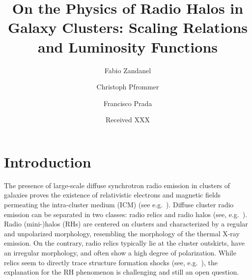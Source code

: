 \documentclass[traditabstract]{aa}
\begin{document}
\title{On the Physics of Radio Halos in Galaxy Clusters: Scaling Relations and Luminosity Functions}

\author{
 Fabio Zandanel \and
 Christoph Pfrommer \and
 Francisco Prada
}

\date{Received XXX}

\abstract{
}




\maketitle


\section{Introduction}
\label{sec:1}
The presence of large-scale diffuse synchrotron radio emission in clusters of
galaxies proves the existence of relativistic electrons and magnetic fields
permeating the intra-cluster medium (ICM) (see
e.g.~\citealp{2004NewAR..48.1137F}).
\begingroup
\let\thefootnote\relax{}
\endgroup
Diffuse cluster radio emission can be separated in two classes: radio relics and
radio halos (see, e.g.~\citealp{2004rcfg.procE..25K,2008SSRv..134...93F}).
Radio \mbox{(mini-)}halos (RHs) are centered on clusters and characterized by a
regular and unpolarized morphology, resembling the morphology of the thermal
X-ray emission. On the contrary, radio relics typically lie at the cluster
outskirts, have an irregular morphology, and often show a high degree of
polarization. While relics seem to directly trace structure formation shocks
(see, e.g.~\citealp{2011A&A...533A..35V}), the explanation for the RH phenomenon
is challenging and still an open question.
                                   
\end{document}
